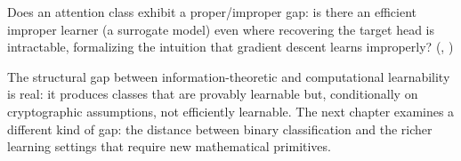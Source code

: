 \begin{openprob}
\label{op:attention-proper-improper}
Does an attention class exhibit a proper/improper gap: is there an efficient
improper learner (a surrogate model) even where recovering the target head is
intractable, formalizing the intuition that gradient descent learns
improperly?  (,
)
\end{openprob}

\bigskip

The structural gap between information-theoretic and computational
learnability is real: it produces classes that are provably learnable but,
conditionally on cryptographic assumptions, not efficiently learnable.  The
next chapter examines a different kind of gap: the distance between binary
classification and the richer learning settings that require new mathematical
primitives.
